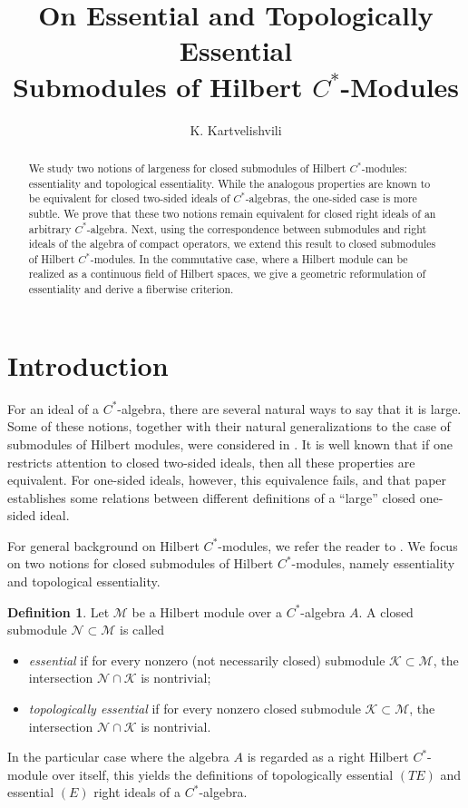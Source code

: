 \documentclass[reqno,a4paper,12pt]{amsart}
\title[Essential Submodules of Hilbert $C^*$-Modules]{On Essential and Topologically Essential \\ Submodules of Hilbert $C^*$-Modules}
\author{K. Kartvelishvili}
\date{}
\theoremstyle{plain}
\theoremstyle{definition}
\newtheorem{definition}[theorem]{Definition}
\newcommand{\M}{\mathcal M}
\newcommand{\N}{\mathcal N}
\begin{document}
	
	\begin{abstract}
		We study two notions of largeness for closed submodules of Hilbert $C^*$-modules: essentiality and topological essentiality.
		While the analogous properties are known to be equivalent for closed two-sided ideals of $C^*$-algebras, the one-sided case is more subtle.
		We prove that these two notions remain equivalent for closed right ideals of an arbitrary $C^*$-algebra.
		Next, using the correspondence between submodules and right ideals of the algebra of compact operators, we extend this result to closed submodules of Hilbert $C^*$-modules.
		In the commutative case, where a Hilbert module can be realized as a continuous field of Hilbert spaces, we give a geometric reformulation of essentiality and derive a fiberwise criterion.
	\end{abstract}
	
	\maketitle
	
	\section{Introduction}
	\label{sec:intro}
	For an ideal of a $C^*$-algebra, there are several natural ways to say that it is large.
	Some of these notions, together with their natural generalizations to the case of submodules of Hilbert modules, were considered in \cite{manuilov}.
	It is well known that if one restricts attention to closed two-sided ideals, then all these properties are equivalent.
	For one-sided ideals, however, this equivalence fails, and that paper establishes some relations between different definitions of a ``large'' closed one-sided ideal.
	
	For general background on Hilbert $C^*$-modules, we refer the reader to \cite{lance}.
	We focus on two notions for closed submodules of Hilbert $C^*$-modules, namely essentiality and topological essentiality.
	\begin{definition}
		\label{def:ess}
		Let $\M$ be a Hilbert module over a $C^*$-algebra $A$.
		A closed submodule $\N \subset \M$ is called
		\begin{itemize}
			\item[$(E)$] \textit{essential} if for every nonzero (not necessarily closed) submodule $\mathcal K \subset \M$, the intersection $\N \cap \mathcal K$ is nontrivial;
			\item[$(TE)$] \textit{topologically essential} if for every nonzero closed submodule $\mathcal K \subset \M$, the intersection $\N \cap \mathcal K$ is nontrivial.
		\end{itemize}
		In the particular case where the algebra $A$ is regarded as a right Hilbert $C^*$-module over itself, this yields the definitions of topologically essential $(TE)$ and essential $(E)$ right ideals of a $C^*$-algebra.
	\end{definition}
	
\end{document}
